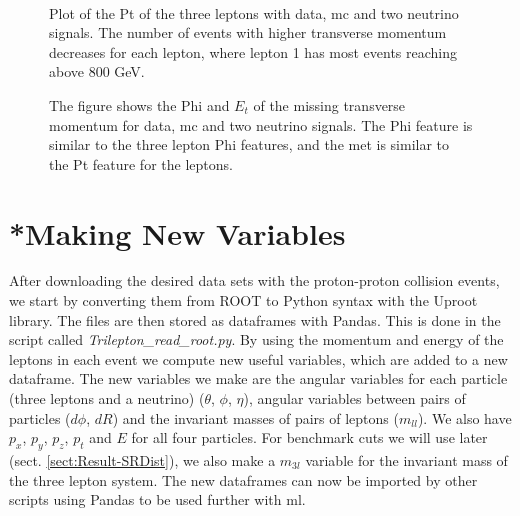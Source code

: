 \documentclass[a4paper, american, 12pt]{report}
\begin{document}
	\begin{figure}[htb!]
		\hspace*{-1.cm}
		\\
		\hspace*{3.cm}
		\caption[Pt plots for the three leptons.]{Plot of the Pt of the three leptons with data, \acrshort{mc} and two neutrino signals. The number of events with higher transverse momentum decreases for each lepton, where lepton 1 has most events reaching above 800 GeV. \label{fig:Pt_orig}}
	\end{figure}

	\begin{figure}[htb!]
		\hspace*{-0.8cm}
		\caption[Phi and missing transverse momentum plots for the neutrino.]{The figure shows the Phi and $E_t$ of the missing transverse momentum for data, \acrshort{mc} and two neutrino signals. The Phi feature is similar to the three lepton Phi features, and the \acrshort{met} is similar to the Pt feature for the leptons. \label{fig:MET_orig}}
	\end{figure}


	\section{*Making New Variables}  %
	\label{sect:Method-MakingVariables}
	After downloading the desired data sets with the proton-proton collision events, we start by converting them from ROOT to Python syntax with the Uproot library. The files are then stored as dataframes with Pandas. This is done in the script called \textit{Trilepton\_read\_root.py}. By using the momentum and energy of the leptons in each event we compute new useful variables, which are added to a new dataframe. The new variables we make are the angular variables for each particle (three leptons and a neutrino) ($\theta$, $\phi$, $\eta$), angular variables between pairs of particles ($d\phi$, $dR$) and the invariant masses of pairs of leptons ($m_{ll}$). We also have $p_x$, $p_y$, $p_z$, $p_t$ and $E$ for all four particles. For benchmark cuts we will use later (sect. \ref{sect:Result-SRDist}), we also make a $m_{3l}$ variable for the invariant mass of the three lepton system. The new dataframes can now be imported by other scripts using Pandas to be used further with \acrshort{ml}. 
	
\end{document}
